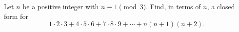 Let $n$ be a positive integer with $n\equiv1\pmod3$. Find, in terms of $n$, a closed form for
\[1\cdot2\cdot3+4\cdot5\cdot6+7\cdot8\cdot9+\cdots+n(n+1)(n+2).\]
